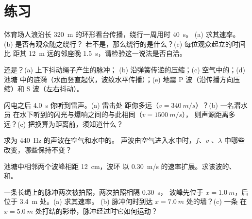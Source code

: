 \section{练习}

\begin{exercise}[$\star$]\label{exo:g12:mechanical-waves:1}
体育场人浪沿长 \qty{320}{m} 的环形看台传播，绕行一周用时 \qty{40}{s}。
(a) 求其速率。(b) 是否有观众随之绕行？
若不是，那么绕行的是什么？(c) 每位观众起立的时间比
距其 \qty{12}{m} 远的邻座晚 \qty{1.5}{s}，请检验这一说法是否自洽。
\end{exercise}

\begin{exercise}[$\star$]\label{exo:g12:mechanical-waves:2}
还是？(a) 上下抖动绳子产生的脉冲；
(b) 沿弹簧传递的压缩；(c) 空气中的；(d) 池塘
中的涟漪（水面竖直起伏，波纹水平传播）；(e)
地震 P 波（沿传播方向压缩）和 S 波（左右抖动）。
\end{exercise}

\begin{exercise}[$\star$]\label{exo:g12:mechanical-waves:3}
闪电之后 \qty{4.0}{s} 你听到雷声。(a) 雷击处
距你多远（$v = \qty{340}{m/s}$）？(b) 一名潜水员
在水下听到的闪光与爆响之间的与此相同（$v = \qty{1500}{m/s}$），
则声源距离多远？(c) 把换算为距离前，须知道什么？
\end{exercise}

\begin{exercise}[$\star$]\label{exo:g12:mechanical-waves:4}
求为 \qty{440}{Hz} 的声波在空气和水中的。
声波由空气进入水中时，$f$、$v$
、$\lambda$ 中哪些改变，哪些保持不变？
\end{exercise}

\begin{exercise}[$\star$]\label{exo:g12:mechanical-waves:5}
池塘中相邻两个波峰相距 \qty{12}{cm}，波环
以 \qty{0.30}{m/s} 的速率扩展。求该波的、
和。
\end{exercise}

\begin{exercise}[$\star\star$]\label{exo:g12:mechanical-waves:6}
一条长绳上的脉冲两次被拍照，两次拍照相隔 \qty{0.30}{s}，
波峰先位于 $x = \qty{1.0}{m}$，后位于 \qty{3.4}{m} 处。(a) 求其速率。
(b) 脉冲何时到达 $x = \qty{7.0}{m}$ 处的墙？(c) 一条
在 $x = \qty{5.0}{m}$ 处打结的彩带，脉冲经过时它如何运动？
\end{exercise}

